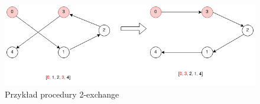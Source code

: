 \begin{figure}[h!]
      \centering
      \includegraphics[width=\textwidth]{chapters/literature/img/2exdrawio.png}
      \caption{Przykład procedury 2-exchange}
      \label{fig:2exchange}
\end{figure}






